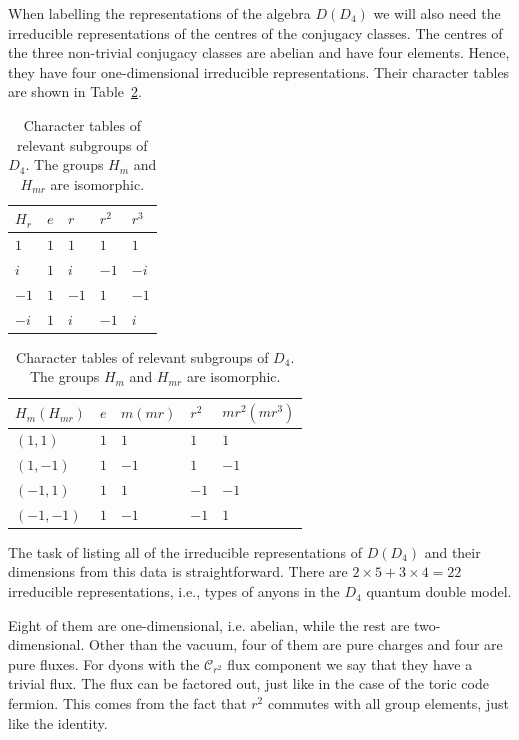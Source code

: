 \documentclass[two column]{article}
\begin{document}
When labelling the representations of the algebra $D(D_4)$ we will also need the irreducible representations of the centres of the conjugacy classes. The centres of the three non-trivial conjugacy classes are abelian and have four elements. Hence, they have four one-dimensional irreducible representations. Their character tables are shown in Table~\ref{tab:char_sub}.
\begin{table}[h]
\centering
\begin{tabular}{|l|llll|}\hline
  $H_r$ & $e$ & $r$ & $r^2$ & $r^3$ \\ \hline
$1$ & $1$   & $1$            & $1$             & $1$                                  \\ 
$i$ & $1$   & $i$            & $-1$             & $-i$                                  \\ 
$-1$ & $1$   & $-1$            & $1$             & $-1$                                  \\ 
$-i$ & $1$   & $i$            & $-1$             & $i$                                  \\ \hline
\end{tabular}
\begin{tabular}{|l|llll|}\hline
  $H_m (H_{mr})$ & $e$ & $m(mr)$ & $r^2$ & $mr^2(mr^3)$ \\ \hline
$(1,1)$ & $1$   & $1$            & $1$             & $1$                                  \\ 
$(1,-1)$ & $1$   & $-1$            & $1$             & $-1$                                  \\ 
$(-1,1)$ & $1$   & $1$            & $-1$             & $-1$                                  \\ 
$(-1,-1)$ & $1$   & $-1$            & $-1$             & $1$                                  \\ \hline
\end{tabular}
\caption{Character tables of relevant subgroups of $D_4$. The groups $H_m$ and $H_{mr}$ are isomorphic.}
\label{tab:char_sub}
\end{table}

The task of listing all of the irreducible representations of $D(D_4)$ and their dimensions from this data is straightforward. There are $2 \times 5  + 3 \times 4 = 22$ irreducible representations, i.e., types of anyons in the $D_4$ quantum double model.

Eight of them are one-dimensional, i.e. abelian, while the rest are two-dimensional. Other than the vacuum, four of them are pure charges and four are pure fluxes. For dyons with the $\mathcal{C}_{r^2}$ flux component we say that they have a trivial flux. The flux can be factored out, just like in the case of the toric code fermion. This comes from the fact that $r^2$ commutes with all group elements, just like the identity. 
\end{document}
